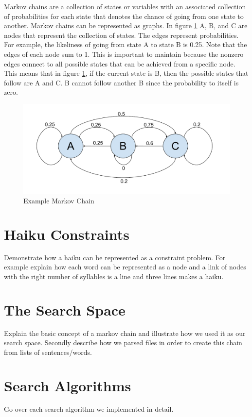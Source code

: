 \documentclass[]{article}
\begin{document}
Markov chains are a collection of states or variables with an associated collection of probabilities for each state that denotes the chance of going from one state to another. Markov chains can be represented as graphs. In figure \ref{fig:Chain} A, B, and C are nodes that represent the collection of states. The edges represent probabilities. For example, the likeliness of going from state A to state B is 0.25. Note that the edges of each node sum to 1. This is important to maintain because the nonzero edges connect to all possible states that can be achieved from a specific node. This means that in figure \ref{fig:Chain}, if the current state is B, then the possible states that follow are A and C. B cannot follow another B since the probability to itself is zero. \cite{Markov}

\begin{figure}[H]
	\centering
	\includegraphics[width=1\textwidth]{MarkovChainExample}
	\caption{Example Markov Chain}
	\label{fig:Chain}
\end{figure}

\section{Haiku Constraints}
Demonstrate how a haiku can be represented as a constraint problem. For example explain how each word can be represented as a node and a link of nodes with the right number of syllables is a line and three lines makes a haiku.

\section{The Search Space}
Explain the basic concept of a markov chain and illustrate how we used it as our search space. Secondly describe how we parsed files in order to create this chain from lists of sentences/words.

\section{Search Algorithms}
Go over each search algorithm we implemented in detail.
\end{document}
